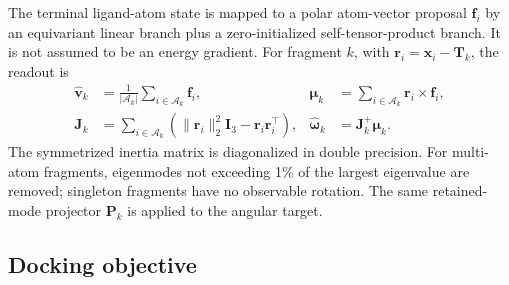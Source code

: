 \documentclass{article}
\renewcommand{\boldsymbol}[1]{\pmb{#1}}
\begin{document}
The terminal ligand-atom state is mapped to a polar atom-vector proposal \(\mathbf f_i\) by an equivariant linear branch plus a zero-initialized self-tensor-product branch.
It is not assumed to be an energy gradient.
For fragment \(k\), with \(\mathbf r_i=\mathbf x_i-\mathbf T_k\), the readout is
\begin{align}
\widehat{\mathbf v}_k
&=\frac{1}{|\mathcal A_k|}\sum_{i\in\mathcal A_k}\mathbf f_i,
&
\boldsymbol\mu_k
&=\sum_{i\in\mathcal A_k}\mathbf r_i\times\mathbf f_i,
\nonumber\\
\mathbf J_k
&=\sum_{i\in\mathcal A_k}
\left(\|\mathbf r_i\|_2^2\mathbf I_3-\mathbf r_i\mathbf r_i^\top\right),
&
\widehat{\boldsymbol\omega}_k
&=\mathbf J_k^+\boldsymbol\mu_k.
\label{eq:si_newton_euler}
\end{align}
The symmetrized inertia matrix is diagonalized in double precision.
For multi-atom fragments, eigenmodes not exceeding 1\% of the largest eigenvalue are removed; singleton fragments have no observable rotation.
The same retained-mode projector \(\mathbf P_k\) is applied to the angular target.

\subsection{Docking objective}
\label{app:loss_details}
\end{document}
